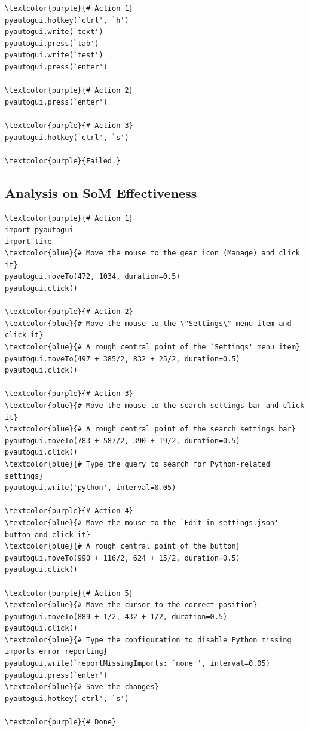 \begin{tcolorbox}[title={Claude3 Failed Task3: \textit{Please help me change all the places in this document that say `text' to `test'.}}]

\begin{Verbatim}[commandchars=\\\{\}]
\textcolor{purple}{# Action 1}
pyautogui.hotkey(`ctrl', `h')
pyautogui.write(`text')
pyautogui.press(`tab')
pyautogui.write(`test')
pyautogui.press(`enter')

\textcolor{purple}{# Action 2}
pyautogui.press(`enter')

\textcolor{purple}{# Action 3}
pyautogui.hotkey(`ctrl', `s')

\textcolor{purple}{Failed.}
\end{Verbatim}
\end{tcolorbox}

\subsection{Analysis on SoM Effectiveness}

\begin{tcolorbox}[title={Task w/o SoM: \textit{turning off the code checking function of the python plugin in vscode}}]

\small
\begin{Verbatim}[commandchars=\\\{\}]
\textcolor{purple}{# Action 1}
import pyautogui
import time
\textcolor{blue}{# Move the mouse to the gear icon (Manage) and click it}
pyautogui.moveTo(472, 1034, duration=0.5) 
pyautogui.click()

\textcolor{purple}{# Action 2}
\textcolor{blue}{# Move the mouse to the \"Settings\" menu item and click it}
\textcolor{blue}{# A rough central point of the `Settings' menu item}
pyautogui.moveTo(497 + 385/2, 832 + 25/2, duration=0.5)  
pyautogui.click()

\textcolor{purple}{# Action 3}
\textcolor{blue}{# Move the mouse to the search settings bar and click it}
\textcolor{blue}{# A rough central point of the search settings bar}
pyautogui.moveTo(783 + 587/2, 390 + 19/2, duration=0.5)  
pyautogui.click()
\textcolor{blue}{# Type the query to search for Python-related settings}
pyautogui.write('python', interval=0.05)

\textcolor{purple}{# Action 4}
\textcolor{blue}{# Move the mouse to the `Edit in settings.json' button and click it}
\textcolor{blue}{# A rough central point of the button}
pyautogui.moveTo(990 + 116/2, 624 + 15/2, duration=0.5)  
pyautogui.click()

\textcolor{purple}{# Action 5}
\textcolor{blue}{# Move the cursor to the correct position}
pyautogui.moveTo(889 + 1/2, 432 + 1/2, duration=0.5)  
pyautogui.click()
\textcolor{blue}{# Type the configuration to disable Python missing imports error reporting}
pyautogui.write(`reportMissingImports: `none'', interval=0.05)
pyautogui.press(`enter')
\textcolor{blue}{# Save the changes}
pyautogui.hotkey(`ctrl', `s')

\textcolor{purple}{# Done}
\end{Verbatim}

\end{tcolorbox}

